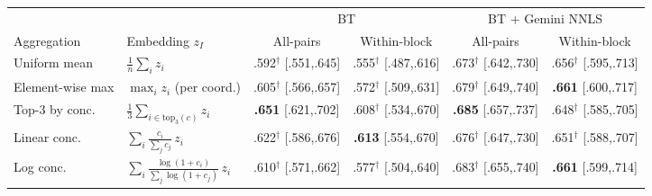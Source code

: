 \begin{center}
\label{tab:ingredient-agg-ablation}
\footnotesize
\setlength{\tabcolsep}{4pt}
\renewcommand{\arraystretch}{0.95}
\begin{tabular}{@{}llcccc@{}}
\toprule
\multicolumn{2}{c}{} & \multicolumn{2}{c}{BT} & \multicolumn{2}{c}{BT $+$ Gemini NNLS} \\
\cmidrule(lr){3-4} \cmidrule(lr){5-6}
Aggregation & Embedding $z_I$ & All-pairs & Within-block & All-pairs & Within-block \\
\midrule
Uniform mean & $\tfrac{1}{n}\sum_i z_i$ & .592$^\dag$ [.551,.645] & .555$^\dag$ [.487,.616] & .673$^\dag$ [.642,.730] & .656$^\dag$ [.595,.713] \\
Element-wise max & $\max_i z_i$ (per coord.) & .605$^\dag$ [.566,.657] & .572$^\dag$ [.509,.631] & .679$^\dag$ [.649,.740] & \textbf{.661} [.600,.717] \\
Top-3 by conc. & $\tfrac{1}{3}\sum_{i \in \mathrm{top}_3(c)} z_i$ & \textbf{.651} [.621,.702] & .608$^\dag$ [.534,.670] & \textbf{.685} [.657,.737] & .648$^\dag$ [.585,.705] \\
Linear conc. & $\sum_i \tfrac{c_i}{\sum_j c_j}\, z_i$ & .622$^\dag$ [.586,.676] & \textbf{.613} [.554,.670] & .676$^\dag$ [.647,.730] & .651$^\dag$ [.588,.707] \\
Log conc. & $\sum_i \tfrac{\log(1+c_i)}{\sum_j \log(1+c_j)}\, z_i$ & .610$^\dag$ [.571,.662] & .577$^\dag$ [.504,.640] & .683$^\dag$ [.655,.740] & \textbf{.661} [.599,.714] \\
\bottomrule
\end{tabular}
\end{center}
